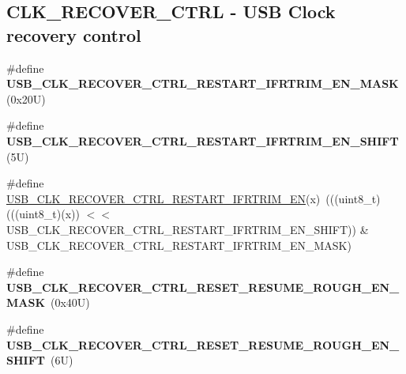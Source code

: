\subsection*{C\+L\+K\+\_\+\+R\+E\+C\+O\+V\+E\+R\+\_\+\+C\+T\+RL -\/ U\+SB Clock recovery control}
\begin{DoxyCompactItemize}
\item 
\mbox{\label{group___u_s_b___register___masks_ga77dc2ce9a51eff644d449abfa8228935}} 
\#define {\bfseries U\+S\+B\+\_\+\+C\+L\+K\+\_\+\+R\+E\+C\+O\+V\+E\+R\+\_\+\+C\+T\+R\+L\+\_\+\+R\+E\+S\+T\+A\+R\+T\+\_\+\+I\+F\+R\+T\+R\+I\+M\+\_\+\+E\+N\+\_\+\+M\+A\+SK}~(0x20\+U)
\item 
\mbox{\label{group___u_s_b___register___masks_gafd08f3eb421e7db973f9940a2111f0a7}} 
\#define {\bfseries U\+S\+B\+\_\+\+C\+L\+K\+\_\+\+R\+E\+C\+O\+V\+E\+R\+\_\+\+C\+T\+R\+L\+\_\+\+R\+E\+S\+T\+A\+R\+T\+\_\+\+I\+F\+R\+T\+R\+I\+M\+\_\+\+E\+N\+\_\+\+S\+H\+I\+FT}~(5\+U)
\item 
\#define \mbox{\hyperlink{group___u_s_b___register___masks_gada4fdb1916b81069fbd064c0493cad58}{U\+S\+B\+\_\+\+C\+L\+K\+\_\+\+R\+E\+C\+O\+V\+E\+R\+\_\+\+C\+T\+R\+L\+\_\+\+R\+E\+S\+T\+A\+R\+T\+\_\+\+I\+F\+R\+T\+R\+I\+M\+\_\+\+EN}}(x)~(((uint8\+\_\+t)(((uint8\+\_\+t)(x)) $<$$<$ U\+S\+B\+\_\+\+C\+L\+K\+\_\+\+R\+E\+C\+O\+V\+E\+R\+\_\+\+C\+T\+R\+L\+\_\+\+R\+E\+S\+T\+A\+R\+T\+\_\+\+I\+F\+R\+T\+R\+I\+M\+\_\+\+E\+N\+\_\+\+S\+H\+I\+FT)) \& U\+S\+B\+\_\+\+C\+L\+K\+\_\+\+R\+E\+C\+O\+V\+E\+R\+\_\+\+C\+T\+R\+L\+\_\+\+R\+E\+S\+T\+A\+R\+T\+\_\+\+I\+F\+R\+T\+R\+I\+M\+\_\+\+E\+N\+\_\+\+M\+A\+SK)
\item 
\mbox{\label{group___u_s_b___register___masks_gae30340de1a58627aeb4aac99ba1b0418}} 
\#define {\bfseries U\+S\+B\+\_\+\+C\+L\+K\+\_\+\+R\+E\+C\+O\+V\+E\+R\+\_\+\+C\+T\+R\+L\+\_\+\+R\+E\+S\+E\+T\+\_\+\+R\+E\+S\+U\+M\+E\+\_\+\+R\+O\+U\+G\+H\+\_\+\+E\+N\+\_\+\+M\+A\+SK}~(0x40\+U)
\item 
\mbox{\label{group___u_s_b___register___masks_ga30a7d01d4ba637c538f8dc499436b81e}} 
\#define {\bfseries U\+S\+B\+\_\+\+C\+L\+K\+\_\+\+R\+E\+C\+O\+V\+E\+R\+\_\+\+C\+T\+R\+L\+\_\+\+R\+E\+S\+E\+T\+\_\+\+R\+E\+S\+U\+M\+E\+\_\+\+R\+O\+U\+G\+H\+\_\+\+E\+N\+\_\+\+S\+H\+I\+FT}~(6\+U)
\item 
$$
\end{DoxyCompactItemize}
